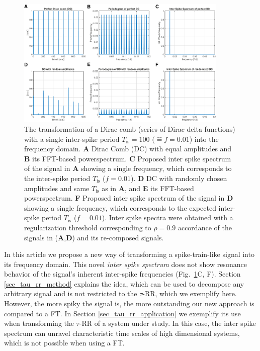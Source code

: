 \begin{figure}[h]
 \centering
 \includegraphics[width=0.9\textwidth]{./figures/fig_tau_rr_dirac_comb}
 \caption{The transformation of a Dirac comb (series of Dirac delta functions) with a single inter-spike period $T_{\text{is}}=100$ ($\widehat{=}f=0.01$) 
 into the frequency domain. 
 \textbf{A} Dirac Comb (DC) with equal amplitudes and
 \textbf{B} its FFT-based powerspectrum.
 \textbf{C} Proposed inter spike spectrum of the signal in \textbf{A} showing a single frequency, which corresponds to the inter-spike period $T_{\text{is}}$ ($f=0.01$).
 \textbf{D} DC with randomly chosen amplitudes and same $T_{\text{is}}$ as in \textbf{A}, and
 \textbf{E} its FFT-based powerspectrum. 
 \textbf{F} Proposed inter spike spectrum of the signal in \textbf{D} showing a single frequency, which corresponds to the expected inter-spike period $T_{\text{is}}$ ($f=0.01$). 
 Inter spike spectra were obtained with a regularization threshold corresponding to $\rho=0.9$ accordance of the signals in (\textbf{A},\textbf{D}) and its re-composed signals. 
}
\label{fig_tau_rr_dirac_comb}
\end{figure}

In this article we propose a new way of transforming a spike-train-like signal into its frequency domain. This novel \textit{inter spike spectrum} does not show resonance 
behavior of the signal's inherent inter-spike frequencies (Fig.~\ref{fig_tau_rr_dirac_comb}C, F). Section \ref{sec_tau_rr_method} explains the idea, which can be used to decompose 
any arbitrary signal and is not restricted to the $\tau$-RR, which we exemplify here. However, the more spiky the signal is, the more outstanding our new approach is compared to a 
FT. In Section \ref{sec_tau_rr_application} we exemplify its use when transforming the $\tau$-RR of a system under study. In this case, the inter spike spectrum can unravel 
characteristic time scales of high dimensional systems, which is not possible when using a FT.

